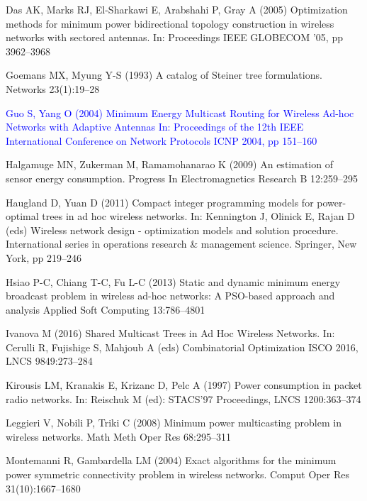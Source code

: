 \documentclass[natbib,smallextended]{svjour3}       %
\begin{document}
\begin{thebibliography}{}
Das AK, Marks RJ, El-Sharkawi E, Arabshahi P, Gray A (2005)
Optimization methods for minimum power bidirectional topology construction in wireless networks with sectored antennas.
In: Proceedings IEEE GLOBECOM ’05, pp 3962--3968

Goemans MX, Myung Y-S (1993)
A catalog of Steiner tree formulations.
Networks
23(1):19--28

\textcolor{blue}{
Guo S, Yang O (2004)
Minimum Energy Multicast Routing for Wireless Ad-hoc Networks with Adaptive Antennas 
In: Proceedings of the 12th IEEE International Conference on Network Protocols ICNP 2004,
pp 151--160}

Halgamuge MN, Zukerman M, Ramamohanarao K (2009)
An estimation of sensor energy consumption.
Progress In Electromagnetics Research B 12:259--295

Haugland D, Yuan D (2011)
Compact integer programming models for power-optimal trees in ad hoc wireless networks.
In: Kennington J, Olinick E, Rajan D (eds) Wireless network design - optimization models and solution procedure.
International series in operations research \& management science.
Springer, New York, pp 219--246

Hsiao P-C, Chiang T-C, Fu L-C (2013)
Static and dynamic minimum energy broadcast problem in wireless ad-hoc networks: A PSO-based approach and analysis
Applied Soft Computing
13:786--4801

Ivanova M (2016)
Shared Multicast Trees in Ad Hoc Wireless Networks.
In: Cerulli R, Fujishige S, Mahjoub A (eds) Combinatorial Optimization ISCO 2016,
LNCS 9849:273--284

Kirousis LM, Kranakis E, Krizanc D, Pelc A (1997)
Power consumption in packet radio networks.
In: Reischuk M (ed): STACS'97 Proceedings,
LNCS 1200:363--374

Leggieri V, Nobili P, Triki C (2008)
Minimum power multicasting problem in wireless networks.
Math Meth Oper Res 68:295–311

Montemanni R, Gambardella LM (2004)
Exact algorithms for the minimum power symmetric connectivity problem in wireless networks.
Comput Oper Res 31(10):1667--1680


\end{thebibliography}
\end{document}
